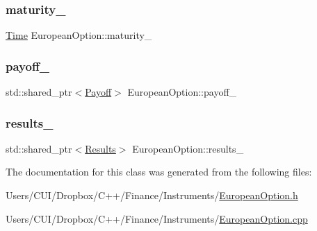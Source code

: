\subsubsection{\texorpdfstring{maturity\+\_\+}{maturity\_}}
{\footnotesize\ttfamily \hyperlink{_name_def_8h_ac2d3e0ba793497bcca555c7c2cf64ff3}{Time} European\+Option\+::maturity\+\_\+\hspace{0.3cm}{\ttfamily [private]}}

\hypertarget{class_european_option_a3d597cb0b811f69a08e49b1af13b5a04}{}\label{class_european_option_a3d597cb0b811f69a08e49b1af13b5a04} 
\subsubsection{\texorpdfstring{payoff\+\_\+}{payoff\_}}
{\footnotesize\ttfamily std\+::shared\+\_\+ptr$<$\hyperlink{class_payoff}{Payoff}$>$ European\+Option\+::payoff\+\_\+\hspace{0.3cm}{\ttfamily [private]}}

\hypertarget{class_european_option_a228f13a5ce4c46caef1e3052b4a27610}{}\label{class_european_option_a228f13a5ce4c46caef1e3052b4a27610} 
\subsubsection{\texorpdfstring{results\+\_\+}{results\_}}
{\footnotesize\ttfamily std\+::shared\+\_\+ptr$<$\hyperlink{class_european_option_1_1_results}{Results}$>$ European\+Option\+::results\+\_\+\hspace{0.3cm}{\ttfamily [private]}}



The documentation for this class was generated from the following files\+:\begin{DoxyCompactItemize}
\item 
Users/\+C\+U\+I/\+Dropbox/\+C++/\+Finance/\+Instruments/\hyperlink{_european_option_8h}{European\+Option.\+h}\item 
Users/\+C\+U\+I/\+Dropbox/\+C++/\+Finance/\+Instruments/\hyperlink{_european_option_8cpp}{European\+Option.\+cpp}\end{DoxyCompactItemize}

